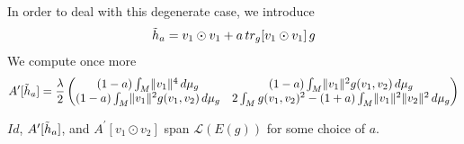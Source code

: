 In order to deal with this degenerate case, we introduce $$\Tilde{h}_a=v_1\odot v_1+a\,tr_g[v_1\odot v_1]\, g$$ We compute once more
\begin{align*}
    A^\prime [\Tilde{h}_a]= \frac{\lambda}{2}
\begin{pmatrix}
    (1-a)\int_M \lVert v_1\rVert^4\,d\mu_g & (1-a) \int_M\lVert v_1\rVert ^2 g(v_1,v_2)\,d\mu_g\\
    (1-a)\int_M \lVert v_1\rVert^2 g(v_1,v_2)\,d\mu_g & 2\int_M g(v_1,v_2)^2-(1+a)\int_M \lVert v_1\rVert^2\lVert v_2\rVert^2\,d\mu_g
\end{pmatrix}
\end{align*}

\begin{lem}
\label{lemma: transversality of curl operator}
    $Id$, $A^{\prime}[\Tilde{h}_a]$, and $A^{\prime}[v_1\odot v_2]$ span $\mathcal{L}(E(g))$ for some choice of $a$.
\end{lem}
